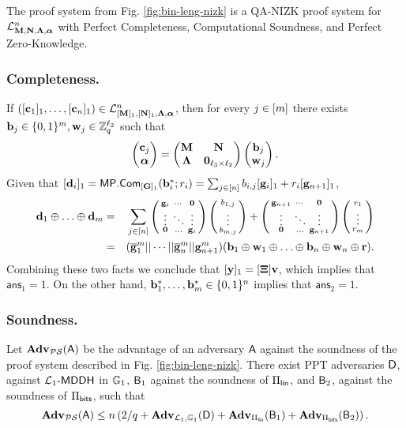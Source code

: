 \begin{theorem}
The proof system from Fig. \ref{fig:bin-leng-nizk} is a QA-NIZK proof system for $\mathcal{L}_{\mathbf{{M}},\mathbf{{N}},\mathbf{{\Lambda}},{\boldsymbol \alpha}}^n$ with Perfect Completeness, Computational Soundness, and Perfect Zero-Knowledge.
\end{theorem}


\subsubsection{Completeness.} If $([\mathbf{c}_1]_1,\ldots,
[\mathbf{{c}}_n]_1) \in\mathcal{L}_{[\mathbf{{M}}]_1,[\mathbf{{N}}]_1,\mathbf{{\Lambda}},{\boldsymbol \alpha}}^n$, then for every $j\in[{m}]$ there exists $\mathbf{{b}}_j\in\{0,1\}^{{m}},\mathbf{{w}}_j \in\mathbb{Z}_q^{{\ell_2}}$ such that 
$$
\left(\begin{matrix}
\mathbf{{c}}_j\\
{\boldsymbol \alpha}
\end{matrix}\right)
=
\begin{pmatrix}
\mathbf{{M}}       & \mathbf{{N}}\\
\mathbf{{\Lambda}} & \mathbf{{0}}_{{\ell_3}\times {\ell_2}}
\end{pmatrix}
\left(\begin{matrix}
    \mathbf{{b}}_j\\
    \mathbf{{w}}_j
\end{matrix}\right).
$$
Given that $[\mathbf{{d}}_i]_1 = \mathsf{MP}.\mathsf{Com}_{[\mathbf{{G}}]_1}(\mathbf{b}_i^*;r_i)=\sum_{j\in[n]}b_{i,j}[\mathbf{g}_i]_1+r_i[\mathbf{g}_{n+1}]_1$,
\begin{eqnarray*}
 \mathbf{d}_1\oplus\ldots\oplus\mathbf{d}_{m}
          &=&  {\sum_{j\in[n]}\left(\begin{smallmatrix}\mathbf{g}_i & \cdots & \mathbf{0}\\\vdots & \ddots & \vdots\\\mathbf{0}& \ldots & \mathbf{g}_i\end{smallmatrix}\right)\left(\begin{smallmatrix}b_{1,j}\\\vdots\\b_{{m},j}\end{smallmatrix}\right)+\left(\begin{smallmatrix}\mathbf{g}_{n+1} & \cdots & \mathbf{0}\\\vdots & \ddots & \vdots\\\mathbf{0}& \ldots & \mathbf{g}_{n+1}\end{smallmatrix}\right)\left(\begin{smallmatrix}r_1\\\vdots\\r_{m}\end{smallmatrix}\right)}\\
         &= & (\overline{\mathbf{g}}_1^{m}||\cdots||\overline{\mathbf{g}}_{n}^{m}||\mathbf{g}_{n+1}^{m})(\mathbf{b}_1\oplus\mathbf{w}_1\oplus\ldots\oplus\mathbf{b}_n\oplus\mathbf{w}_n\oplus\mathbf{r}).
\end{eqnarray*}
Combining these two facts we conclude that
$[\mathbf{y}]_1 = [\mathbf{{\Xi}}] \mathbf{v}$, which implies that $\mathsf{ans}_1=1$. On the other hand, $\mathbf{b}_1^*,\ldots,\mathbf{b}_{m}^*\in\{0,1\}^n$ implies that $\mathsf{ans}_2=1$.
  
\subsubsection{Soundness.}

\begin{theorem}
Let $\mathbf{Adv}_{\mathcal{PS}}(\mathsf{A})$ be the advantage of an adversary $\mathsf{A}$ against the soundness of the proof system described in Fig. \ref{fig:bin-leng-nizk}. There exist PPT adversaries $\mathsf{D}$, against $\mathcal{L}_1\mbox{-}\mathsf{MDDH}$ in $\mathbb{G}_1$, $\mathsf{B}_1$ against the soundness of $\Pi_{\mathsf{lin}}$, and $\mathsf{B}_2$, against the soundness of $\Pi_{\mathsf{bits}}$, such that
$$
\mathbf{Adv}_{\mathcal{PS}}(\mathsf{A})\leq n\left(2/q + \mathbf{Adv}_{\mathcal{L}_1,\mathbb{G}_1}(\mathsf{D})+\mathbf{Adv}_{\Pi_{\mathsf{lin}}}(\mathsf{B}_1)+\mathbf{Adv}_{\Pi_{\mathsf{bits}}}(\mathsf{B}_2)\right).
$$
\end{theorem}

